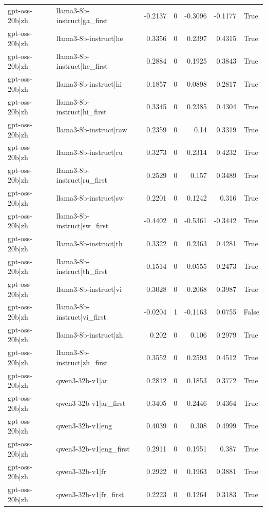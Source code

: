 \begin{table}
\begin{tabular}{l l r r r r l}
gpt-oss-20b|zh & llama3-8b-instruct|ga_first & -0.2137 & 0 & -0.3096 & -0.1177 & True \\
gpt-oss-20b|zh & llama3-8b-instruct|he & 0.3356 & 0 & 0.2397 & 0.4315 & True \\
gpt-oss-20b|zh & llama3-8b-instruct|he_first & 0.2884 & 0 & 0.1925 & 0.3843 & True \\
gpt-oss-20b|zh & llama3-8b-instruct|hi & 0.1857 & 0 & 0.0898 & 0.2817 & True \\
gpt-oss-20b|zh & llama3-8b-instruct|hi_first & 0.3345 & 0 & 0.2385 & 0.4304 & True \\
gpt-oss-20b|zh & llama3-8b-instruct|raw & 0.2359 & 0 & 0.14 & 0.3319 & True \\
gpt-oss-20b|zh & llama3-8b-instruct|ru & 0.3273 & 0 & 0.2314 & 0.4232 & True \\
gpt-oss-20b|zh & llama3-8b-instruct|ru_first & 0.2529 & 0 & 0.157 & 0.3489 & True \\
gpt-oss-20b|zh & llama3-8b-instruct|sw & 0.2201 & 0 & 0.1242 & 0.316 & True \\
gpt-oss-20b|zh & llama3-8b-instruct|sw_first & -0.4402 & 0 & -0.5361 & -0.3442 & True \\
gpt-oss-20b|zh & llama3-8b-instruct|th & 0.3322 & 0 & 0.2363 & 0.4281 & True \\
gpt-oss-20b|zh & llama3-8b-instruct|th_first & 0.1514 & 0 & 0.0555 & 0.2473 & True \\
gpt-oss-20b|zh & llama3-8b-instruct|vi & 0.3028 & 0 & 0.2068 & 0.3987 & True \\
gpt-oss-20b|zh & llama3-8b-instruct|vi_first & -0.0204 & 1 & -0.1163 & 0.0755 & False \\
gpt-oss-20b|zh & llama3-8b-instruct|zh & 0.202 & 0 & 0.106 & 0.2979 & True \\
gpt-oss-20b|zh & llama3-8b-instruct|zh_first & 0.3552 & 0 & 0.2593 & 0.4512 & True \\
gpt-oss-20b|zh & qwen3-32b-v1|ar & 0.2812 & 0 & 0.1853 & 0.3772 & True \\
gpt-oss-20b|zh & qwen3-32b-v1|ar_first & 0.3405 & 0 & 0.2446 & 0.4364 & True \\
gpt-oss-20b|zh & qwen3-32b-v1|eng & 0.4039 & 0 & 0.308 & 0.4999 & True \\
gpt-oss-20b|zh & qwen3-32b-v1|eng_first & 0.2911 & 0 & 0.1951 & 0.387 & True \\
gpt-oss-20b|zh & qwen3-32b-v1|fr & 0.2922 & 0 & 0.1963 & 0.3881 & True \\
gpt-oss-20b|zh & qwen3-32b-v1|fr_first & 0.2223 & 0 & 0.1264 & 0.3183 & True \\

\end{tabular}
\end{table}

